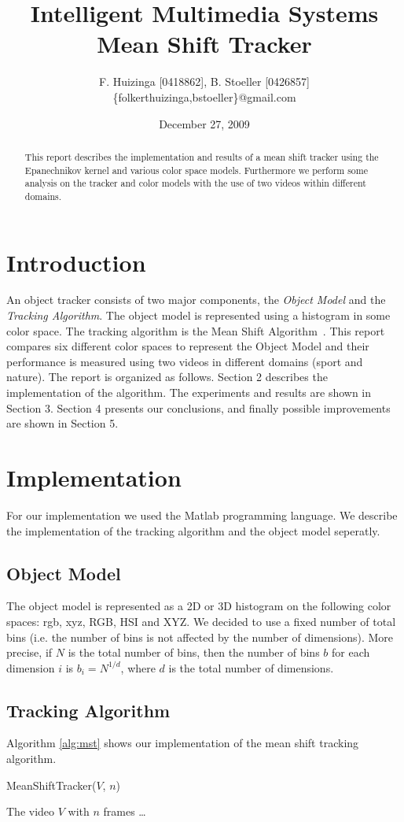 \documentclass[11pt]{article}
\title{Intelligent Multimedia Systems \\ Mean Shift Tracker}
\author{F. Huizinga [0418862], B. Stoeller [0426857] \\
      \{folkerthuizinga,bstoeller\}@gmail.com}
\date{December 27, 2009}
\begin{document}
\maketitle

\begin{abstract}
This report describes the implementation and results of a mean shift tracker
using the Epanechnikov kernel and various color space models. Furthermore we
perform some analysis on the tracker and color models with the use of two
videos within different domains.
\end{abstract}


\section{Introduction}
An object tracker consists of two major components, the \emph{Object Model} and
the \emph{Tracking Algorithm}. The object model is represented using a
histogram in some color space. The tracking algorithm is the Mean Shift
Algorithm~\cite{kernel-basedobject, real-timetracking}. This report compares
six different color spaces to represent the Object Model and their performance
is measured using two videos in different domains (sport and nature). The
report is organized as follows.  Section 2 describes the implementation of the
algorithm. The experiments and results are shown in Section 3. Section 4
presents our conclusions, and finally possible improvements are shown in
Section 5.


\section{Implementation}
For our implementation we used the Matlab programming language. We describe the
implementation of the tracking algorithm and the object model seperatly.

\subsection{Object Model}
The object model is represented as a 2D or 3D histogram on the following color
spaces: rgb, xyz, RGB, HSI and XYZ. We decided to use a fixed number of total
bins (i.e. the number of bins is not affected by the number of dimensions).
More precise, if $N$ is the total number of bins, then the number of bins $b$
for each dimension $i$ is $b_i = N^{1/d}$, where $d$ is the total number of
dimensions. 

\subsection{Tracking Algorithm}
Algorithm \ref{alg:mst} shows our implementation of the mean shift tracking
algorithm.
\begin{algorithm}
	\caption{MeanShiftTracker($V$, $n$)}
	\begin{algorithmic}[1]
	\REQUIRE The video $V$ with $n$ frames
	\STATE \dots
	\medskip
	\end{algorithmic}
\label{alg:mst}
\end{algorithm}
\end{document}
